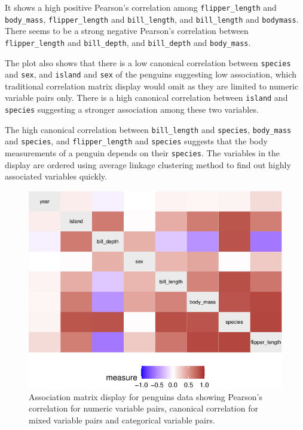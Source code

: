 It shows a high positive Pearson's correlation among
\texttt{flipper\_length} and \texttt{body\_mass},
\texttt{flipper\_length} and \texttt{bill\_length}, and
\texttt{bill\_length} and \texttt{bodymass}. There seems to be a strong
negative Pearson's correlation between \texttt{flipper\_length} and
\texttt{bill\_depth}, and \texttt{bill\_depth} and \texttt{body\_mass}.

The plot also shows that there is a low canonical correlation between
\texttt{species} and \texttt{sex}, and \texttt{island} and \texttt{sex}
of the penguins suggesting low association, which traditional
correlation matrix display would omit as they are limited to numeric
variable pairs only. There is a high canonical correlation between
\texttt{island} and \texttt{species} suggesting a stronger association
among these two variables.

The high canonical correlation between \texttt{bill\_length} and
\texttt{species}, \texttt{body\_mass} and \texttt{species}, and
\texttt{flipper\_length} and \texttt{species} suggests that the body
measurements of a penguin depends on their \texttt{species}. The
variables in the display are ordered using average linkage clustering
method to find out highly associated variables quickly.

\begin{Schunk}
\begin{figure}

{\centering \includegraphics{rj_paper_files/figure-latex/assoc-heatmap-1} 

}

\caption[Association matrix display for penguins data showing Pearson's correlation for numeric variable pairs, canonical correlation for mixed variable pairs and categorical variable pairs]{Association matrix display for penguins data showing Pearson's correlation for numeric variable pairs, canonical correlation for mixed variable pairs and categorical variable pairs.}\label{fig:assoc-heatmap}
\end{figure}
\end{Schunk}

